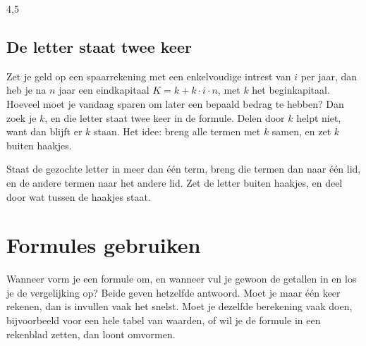 \begin{alleenvoor}{4,5}
\subsection{De letter staat twee keer}

Zet je geld op een spaarrekening met een enkelvoudige intrest van $i$ per jaar, dan heb je na $n$ jaar een eindkapitaal $K = k + k \cdot i \cdot n$, met $k$ het beginkapitaal. Hoeveel moet je vandaag sparen om later een bepaald bedrag te hebben? Dan zoek je $k$, en die letter staat twee keer in de formule. Delen door $k$ helpt niet, want dan blijft er $k$ staan. Het idee: breng alle termen met $k$ samen, en zet $k$ buiten haakjes.


\begin{werkwijze}
Staat de gezochte letter in meer dan één term, breng die termen dan naar één lid, en de andere termen naar het andere lid. Zet de letter buiten haakjes, en deel door wat tussen de haakjes staat.
\end{werkwijze}

\begin{oefeningen}
\end{oefeningen}
\end{alleenvoor}

\section{Formules gebruiken}

Wanneer vorm je een formule om, en wanneer vul je gewoon de getallen in en los je de vergelijking op? Beide geven hetzelfde antwoord. Moet je maar één keer rekenen, dan is invullen vaak het snelst. Moet je dezelfde berekening vaak doen, bijvoorbeeld voor een hele tabel van waarden, of wil je de formule in een rekenblad zetten, dan loont omvormen.

